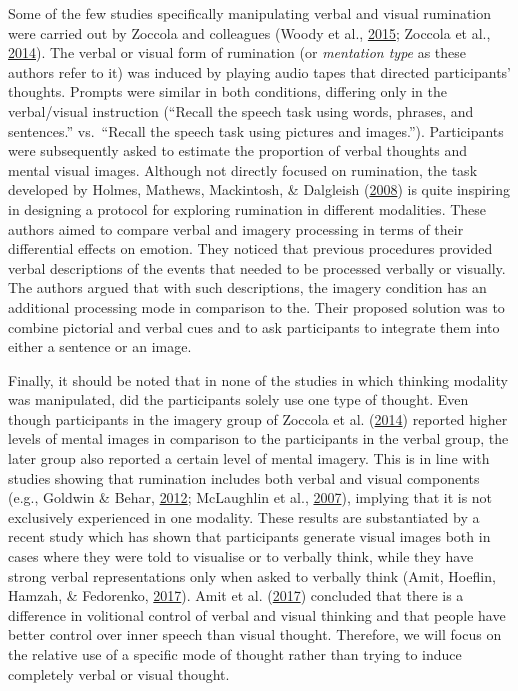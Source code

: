 \documentclass[a4paper,12pt,twoside,openright,oldfontcommands]{memoir}
\begin{document}
Some of the few studies specifically manipulating verbal and visual rumination were carried out by Zoccola and colleagues (Woody et al., \protect\hyperlink{ref-woody_trait_2015}{2015}; Zoccola et al., \protect\hyperlink{ref-zoccola_cardiovascular_2014}{2014}). The verbal or visual form of rumination (or \emph{mentation type} as these authors refer to it) was induced by playing audio tapes that directed participants' thoughts. Prompts were similar in both conditions, differing only in the verbal/visual instruction (\enquote{Recall the speech task using words, phrases, and sentences.} vs.~\enquote{Recall the speech task using pictures and images.}). Participants were subsequently asked to estimate the proportion of verbal thoughts and mental visual images. Although not directly focused on rumination, the task developed by Holmes, Mathews, Mackintosh, \& Dalgleish (\protect\hyperlink{ref-holmes_causal_2008}{2008}) is quite inspiring in designing a protocol for exploring rumination in different modalities. These authors aimed to compare verbal and imagery processing in terms of their differential effects on emotion. They noticed that previous procedures provided verbal descriptions of the events that needed to be processed verbally or visually. The authors argued that with such descriptions, the imagery condition has an additional processing mode in comparison to the. Their proposed solution was to combine pictorial and verbal cues and to ask participants to integrate them into either a sentence or an image.

Finally, it should be noted that in none of the studies in which thinking modality was manipulated, did the participants solely use one type of thought. Even though participants in the imagery group of Zoccola et al. (\protect\hyperlink{ref-zoccola_cardiovascular_2014}{2014}) reported higher levels of mental images in comparison to the participants in the verbal group, the later group also reported a certain level of mental imagery. This is in line with studies showing that rumination includes both verbal and visual components (e.g., Goldwin \& Behar, \protect\hyperlink{ref-goldwin_concreteness_2012}{2012}; McLaughlin et al., \protect\hyperlink{ref-mclaughlin_effects_2007}{2007}), implying that it is not exclusively experienced in one modality. These results are substantiated by a recent study which has shown that participants generate visual images both in cases where they were told to visualise or to verbally think, while they have strong verbal representations only when asked to verbally think (Amit, Hoeflin, Hamzah, \& Fedorenko, \protect\hyperlink{ref-amit_asymmetrical_2017}{2017}). Amit et al. (\protect\hyperlink{ref-amit_asymmetrical_2017}{2017}) concluded that there is a difference in volitional control of verbal and visual thinking and that people have better control over inner speech than visual thought. Therefore, we will focus on the relative use of a specific mode of thought rather than trying to induce completely verbal or visual thought.
\end{document}
